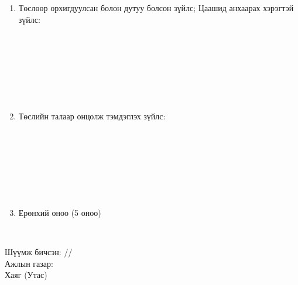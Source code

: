 \begin{titlepage}
\begin{enumerate}
\begin{center}
\dotfill \\[0.1cm]
\dotfill \\[0.1cm]
\dotfill \\[0.1cm]
\dotfill \\[0.1cm]
\dotfill \\[0.1cm]
\dotfill \\[0.4cm]
\end{center}
\item Төслөөр орхигдуулсан болон дутуу болсон зүйлс; Цаашид анхаарах хэрэгтэй зүйлс:
\begin{center}
\dotfill \\[0.1cm]
\dotfill \\[0.1cm]
\dotfill \\[0.1cm]
\dotfill \\[0.1cm]
\dotfill \\[0.1cm]
\dotfill \\[0.4cm]
\end{center}
\item Төслийн талаар онцолж тэмдэглэх зүйлс:
\begin{center}
\dotfill \\[0.1cm]
\dotfill \\[0.1cm]
\dotfill \\[0.1cm]
\dotfill \\[0.1cm]
\dotfill \\[0.1cm]
\dotfill \\[0.4cm]
\end{center}
\item Ерөнхий оноо (5 оноо)
\begin{center}
\dotfill \\[1cm]
\end{center}
\end{enumerate}
Шүүмж бичсэн: \makebox[3cm]{\dotfill} /\readname/ \\[0.5cm]
Ажлын газар: \dotfill \\[0.5cm]
Хаяг (Утас) \makebox[5cm]{\dotfill}

\end{titlepage}
